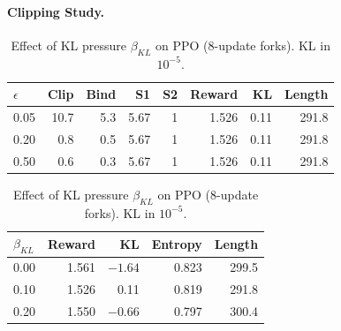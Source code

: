 \documentclass{article}
\newcommand{\tabsetup}{\footnotesize\setlength{\tabcolsep}{4pt}\renewcommand{\arraystretch}{0.95}}
\begin{document}
\paragraph{Clipping Study.}\label{subsubsec:results-t2-clipping}
\begin{table}[t]
\centering
\tabsetup
\begin{minipage}[b]{0.53\linewidth}
\caption{Effect of clip range $\epsilon$ on PPO (8-update forks). S1 in $10^{-4}$, KL in $10^{-5}$.}
\label{tab:ppo-clip}
\end{minipage}\hfill
\begin{minipage}[b]{0.43\linewidth}
\caption{Effect of KL pressure $\beta_{KL}$ on PPO (8-update forks). KL in $10^{-5}$.}
\label{tab:ppo-kl}
\end{minipage}

\begin{minipage}[t]{0.53\linewidth}\centering
\begin{tabular*}{\linewidth}{@{\extracolsep{\fill}}lrrrrrrr}
\toprule
$\epsilon$ & Clip & Bind & S1 & S2 & Reward & KL & Length \\
\midrule
0.05 & 10.7 & 5.3 & 5.67 & 1 & 1.526 & 0.11 & 291.8 \\
0.20 & 0.8 & 0.5 & 5.67 & 1 & 1.526 & 0.11 & 291.8 \\
0.50 & 0.6 & 0.3 & 5.67 & 1 & 1.526 & 0.11 & 291.8 \\
\bottomrule
\end{tabular*}
\end{minipage}\hfill
\begin{minipage}[t]{0.43\linewidth}\centering
\begin{tabular*}{\linewidth}{@{\extracolsep{\fill}}lrrrr}
\toprule
$\beta_{KL}$ & Reward & KL & Entropy & Length \\
\midrule
0.00 & 1.561 & $-1.64$ & 0.823 & 299.5 \\
0.10 & 1.526 & 0.11 & 0.819 & 291.8 \\
0.20 & 1.550 & $-0.66$ & 0.797 & 300.4 \\
\bottomrule
\end{tabular*}
\end{minipage}
\vspace{2pt}


\end{table}
\end{document}

